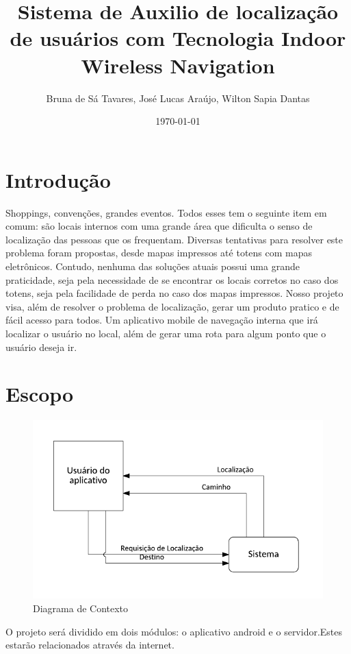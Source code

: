 \documentclass[13pt]{article}
\begin{document}
\title{Sistema de Auxilio de localização de usuários com Tecnologia Indoor Wireless Navigation}
\author{Bruna de Sá Tavares, José Lucas Araújo, Wilton Sapia Dantas}
\date{\today}
\maketitle  

\section*{Introdução}
	Shoppings, convenções, grandes eventos. Todos esses tem o seguinte item em comum: são locais internos com uma grande área que dificulta o senso de localização das pessoas que os frequentam. Diversas tentativas para resolver este problema foram propostas, desde mapas impressos até totens com mapas eletrônicos. Contudo, nenhuma das soluções atuais possui uma grande praticidade, seja pela necessidade de se encontrar os locais corretos no caso dos totens, seja pela facilidade de perda no caso dos mapas impressos. Nosso projeto visa, além de resolver o problema de localização, gerar um produto pratico e de fácil acesso para todos. Um aplicativo mobile de navegação interna que irá localizar o usuário no local, além de gerar uma rota para algum ponto que o usuário deseja ir.

\section*{Escopo}
	\begin{figure}[!htb]
		\centering
		\includegraphics[scale=0.5]{diagramaContexto.PNG}
		\caption{Diagrama de Contexto}
	\end{figure}
	O projeto será dividido em dois módulos: o aplicativo android e o servidor.Estes estarão relacionados através da internet.
\end{document}

